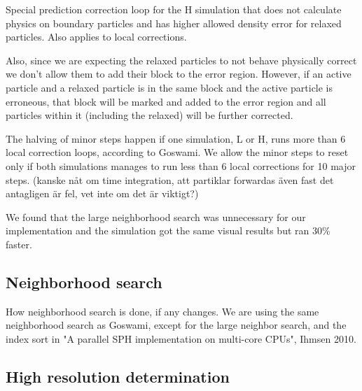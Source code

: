 \documentclass[../../main.tex]{subfiles}
\begin{document}
Special prediction correction loop for the H simulation that does not calculate physics on boundary particles and has higher allowed density error for relaxed particles. Also applies to local corrections. 

Also, since we are expecting the relaxed particles to not behave physically correct we don't allow them to add their block to the error region. However, if an active particle and a relaxed particle is in the same block and the active particle is erroneous, that block will be marked and added to the error region and all particles within it (including the relaxed) will be further corrected. 

The halving of minor steps happen if one simulation, L or H, runs more than 6 local correction loops, according to Goswami. We allow the minor steps to reset only if both simulations manages to run less than 6 local corrections for 10 major steps. (kanske nåt om time integration, att partiklar forwardas även fast det antagligen är fel, vet inte om det är viktigt?)

We found that the large neighborhood search was unnecessary for our implementation and the simulation got the same visual results but ran 30\% faster. 

\subsection{Neighborhood search}
{\color{red}How neighborhood search is done, if any changes.}
We are using the same neighborhood search as Goswami, except for the large neighbor search, and the index sort in "A parallel SPH implementation on multi-core CPUs", Ihmsen 2010. 

\subsection{High resolution determination}
\end{document}
